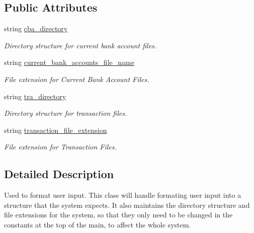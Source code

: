 \subsection*{Public Attributes}
\begin{DoxyCompactItemize}
\item 
string \hyperlink{classInteractiveStreamHandler_a48a8d769c4e9b47f782adf1a3f515477}{cba\_\-directory}
\begin{DoxyCompactList}\small\item\em Directory structure for current bank account files. \item\end{DoxyCompactList}\item 
string \hyperlink{classInteractiveStreamHandler_a422f78691f53bc8a8b79f2c8e7edc04f}{current\_\-bank\_\-accounts\_\-file\_\-name}
\begin{DoxyCompactList}\small\item\em File extension for Current Bank Account Files. \item\end{DoxyCompactList}\item 
string \hyperlink{classInteractiveStreamHandler_afb0932ba0075caf93d401e5d695e963f}{tra\_\-directory}
\begin{DoxyCompactList}\small\item\em Directory structure for transaction files. \item\end{DoxyCompactList}\item 
string \hyperlink{classInteractiveStreamHandler_a64aa30a05a73cac597f445d5a581f4b9}{transaction\_\-file\_\-extension}
\begin{DoxyCompactList}\small\item\em File extension for Transaction Files. \item\end{DoxyCompactList}\end{DoxyCompactItemize}


\subsection{Detailed Description}
Used to format user input. This class will handle formating user input into a structure that the system expects. It also maintains the directory structure and file extensions for the system, so that they only need to be changed in the constants at the top of the main, to affect the whole system.

